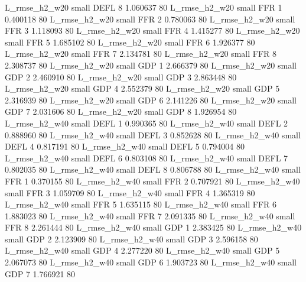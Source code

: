  L_rmse_h2_w20      small     DEFL                 8 1.060637 80
 L_rmse_h2_w20      small      FFR                 1 0.400118 80
 L_rmse_h2_w20      small      FFR                 2 0.780063 80
 L_rmse_h2_w20      small      FFR                 3 1.118093 80
 L_rmse_h2_w20      small      FFR                 4 1.415277 80
 L_rmse_h2_w20      small      FFR                 5 1.685102 80
 L_rmse_h2_w20      small      FFR                 6 1.926377 80
 L_rmse_h2_w20      small      FFR                 7 2.134781 80
 L_rmse_h2_w20      small      FFR                 8 2.308737 80
 L_rmse_h2_w20      small      GDP                 1 2.666379 80
 L_rmse_h2_w20      small      GDP                 2 2.460910 80
 L_rmse_h2_w20      small      GDP                 3 2.863448 80
 L_rmse_h2_w20      small      GDP                 4 2.552379 80
 L_rmse_h2_w20      small      GDP                 5 2.316939 80
 L_rmse_h2_w20      small      GDP                 6 2.141226 80
 L_rmse_h2_w20      small      GDP                 7 2.031606 80
 L_rmse_h2_w20      small      GDP                 8 1.926954 80
 L_rmse_h2_w40      small     DEFL                 1 0.990365 80
 L_rmse_h2_w40      small     DEFL                 2 0.888960 80
 L_rmse_h2_w40      small     DEFL                 3 0.852628 80
 L_rmse_h2_w40      small     DEFL                 4 0.817191 80
 L_rmse_h2_w40      small     DEFL                 5 0.794004 80
 L_rmse_h2_w40      small     DEFL                 6 0.803108 80
 L_rmse_h2_w40      small     DEFL                 7 0.802035 80
 L_rmse_h2_w40      small     DEFL                 8 0.806788 80
 L_rmse_h2_w40      small      FFR                 1 0.370155 80
 L_rmse_h2_w40      small      FFR                 2 0.707921 80
 L_rmse_h2_w40      small      FFR                 3 1.059709 80
 L_rmse_h2_w40      small      FFR                 4 1.365319 80
 L_rmse_h2_w40      small      FFR                 5 1.635115 80
 L_rmse_h2_w40      small      FFR                 6 1.883023 80
 L_rmse_h2_w40      small      FFR                 7 2.091335 80
 L_rmse_h2_w40      small      FFR                 8 2.261444 80
 L_rmse_h2_w40      small      GDP                 1 2.383425 80
 L_rmse_h2_w40      small      GDP                 2 2.123909 80
 L_rmse_h2_w40      small      GDP                 3 2.596158 80
 L_rmse_h2_w40      small      GDP                 4 2.277220 80
 L_rmse_h2_w40      small      GDP                 5 2.067073 80
 L_rmse_h2_w40      small      GDP                 6 1.903723 80
 L_rmse_h2_w40      small      GDP                 7 1.766921 80
